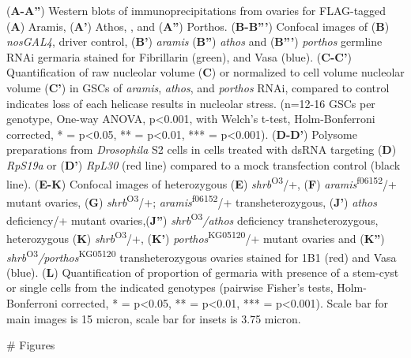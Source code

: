 \documentclass[12pt,oneside]{reedthesis}
\begin{document}
\textbf{\hfill\break
}

(\textbf{A-A''}) Western blots of immunoprecipitations from ovaries for FLAG-tagged
(\textbf{A}) Aramis, (\textbf{A'}) Athos, , and (\textbf{A''}) Porthos. (\textbf{B-B'''})
Confocal images of (\textbf{B}) \emph{nosGAL4}, driver control, (\textbf{B'}) \emph{aramis}
(\textbf{B''}) \emph{athos} and (\textbf{B'''}) \emph{porthos} germline RNAi germaria
stained for Fibrillarin (green), and Vasa (blue). (\textbf{C-C'})
Quantification of raw nucleolar volume (\textbf{C}) or normalized to cell
volume nucleolar volume (\textbf{C'}) in GSCs of \emph{aramis}, \emph{athos}, and
\emph{porthos} RNAi, compared to control indicates loss of each helicase
results in nucleolar stress. (n=12-16 GSCs per genotype, One-way ANOVA,
p\textless0.001, with Welch's t-test, Holm-Bonferroni corrected, * = p\textless0.05,
** = p\textless0.01, *** = p\textless0.001). (\textbf{D-D'}) Polysome preparations
from \emph{Drosophila} S2 cells in cells treated with dsRNA targeting (\textbf{D})
\emph{RpS19a} or (\textbf{D'}) \emph{RpL30} (red line) compared to a mock transfection
control (black line). (\textbf{E-K}) Confocal images of heterozygous (\textbf{E})
\emph{shrb}\textsuperscript{O3}/+, (\textbf{F}) \emph{aramis}\textsuperscript{f06152}/+ mutant ovaries, (\textbf{G})
\emph{shrb}\textsuperscript{O3}/+; \emph{aramis}\textsuperscript{f06152}/+ transheterozygous, (\textbf{J'}) \emph{athos}
deficiency/+ mutant ovaries,(\textbf{J''}) \emph{shrb}\textsuperscript{O3}\emph{/athos} deficiency
transheterozygous, heterozygous (\textbf{K}) \emph{shrb}\textsuperscript{O3}/+, (\textbf{K'})
\emph{porthos}\textsuperscript{KG05120}/+ mutant ovaries and (\textbf{K''})
\emph{shrb}\textsuperscript{O3}\emph{/porthos}\textsuperscript{KG05120} transheterozygous ovaries stained for 1B1
(red) and Vasa (blue). (\textbf{L}) Quantification of proportion of germaria
with presence of a stem-cyst or single cells from the indicated
genotypes (pairwise Fisher's tests, Holm-Bonferroni corrected, * =
p\textless0.05, ** = p\textless0.01, *** = p\textless0.001). Scale bar for main images
is 15 micron, scale bar for insets is 3.75 micron.

\textbf{\hfill\break
}
\# Figures
\end{document}
